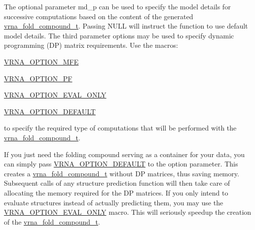 The optional parameter {\ttfamily md\+\_\+p} can be used to specify the model details for successive computations based on the content of the generated \hyperlink{group__fold__compound_ga1b0cef17fd40466cef5968eaeeff6166}{vrna\+\_\+fold\+\_\+compound\+\_\+t}. Passing N\+U\+LL will instruct the function to use default model details. The third parameter {\ttfamily options} may be used to specify dynamic programming (DP) matrix requirements. Use the macros\+:


\begin{DoxyItemize}
\item \hyperlink{group__fold__compound_gae63be9127fe7dcc1f9bb14f5bb1064ee}{V\+R\+N\+A\+\_\+\+O\+P\+T\+I\+O\+N\+\_\+\+M\+FE}
\item \hyperlink{group__fold__compound_gabfbadcddda3e74ce7f49035ef8f058f7}{V\+R\+N\+A\+\_\+\+O\+P\+T\+I\+O\+N\+\_\+\+PF}
\item \hyperlink{group__fold__compound_ga61469c423131552c8483229f8b6c7e0e}{V\+R\+N\+A\+\_\+\+O\+P\+T\+I\+O\+N\+\_\+\+E\+V\+A\+L\+\_\+\+O\+N\+LY}
\item \hyperlink{group__fold__compound_gacea5b7ee6181c485f36e2afa0e9089e4}{V\+R\+N\+A\+\_\+\+O\+P\+T\+I\+O\+N\+\_\+\+D\+E\+F\+A\+U\+LT}
\end{DoxyItemize}

to specify the required type of computations that will be performed with the \hyperlink{group__fold__compound_ga1b0cef17fd40466cef5968eaeeff6166}{vrna\+\_\+fold\+\_\+compound\+\_\+t}.

If you just need the folding compound serving as a container for your data, you can simply pass \hyperlink{group__fold__compound_gacea5b7ee6181c485f36e2afa0e9089e4}{V\+R\+N\+A\+\_\+\+O\+P\+T\+I\+O\+N\+\_\+\+D\+E\+F\+A\+U\+LT} to the {\ttfamily option} parameter. This creates a \hyperlink{group__fold__compound_ga1b0cef17fd40466cef5968eaeeff6166}{vrna\+\_\+fold\+\_\+compound\+\_\+t} without DP matrices, thus saving memory. Subsequent calls of any structure prediction function will then take care of allocating the memory required for the DP matrices. If you only intend to evaluate structures instead of actually predicting them, you may use the \hyperlink{group__fold__compound_ga61469c423131552c8483229f8b6c7e0e}{V\+R\+N\+A\+\_\+\+O\+P\+T\+I\+O\+N\+\_\+\+E\+V\+A\+L\+\_\+\+O\+N\+LY} macro. This will seriously speedup the creation of the \hyperlink{group__fold__compound_ga1b0cef17fd40466cef5968eaeeff6166}{vrna\+\_\+fold\+\_\+compound\+\_\+t}.

